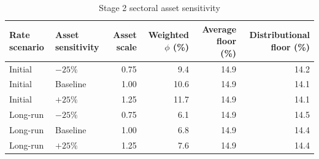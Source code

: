 \begin{table}[H]
\centering
\footnotesize
\setlength{\tabcolsep}{3pt}
\caption{Stage 2 sectoral asset sensitivity}
\label{tab:app_stage2_asset_sensitivity}
\begin{tabular}{@{}llrrrr@{}}
\toprule
Rate scenario & Asset sensitivity & Asset scale & Weighted $\phi$ (\%) & Average floor (\%) & Distributional floor (\%) \\
\midrule
Initial & $-25\%$ & 0.75 &  9.4 & 14.9 & 14.2 \\
Initial & Baseline & 1.00 & 10.6 & 14.9 & 14.1 \\
Initial & $+25\%$ & 1.25 & 11.7 & 14.9 & 14.1 \\
Long-run & $-25\%$ & 0.75 &  6.1 & 14.9 & 14.5 \\
Long-run & Baseline & 1.00 &  6.8 & 14.9 & 14.4 \\
Long-run & $+25\%$ & 1.25 &  7.6 & 14.9 & 14.4 \\
\bottomrule
\end{tabular}
\end{table}
